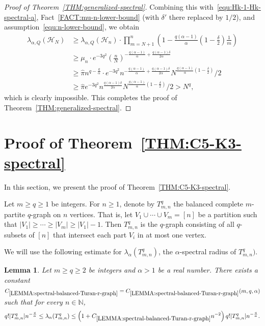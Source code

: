 \documentclass[11pt,a4paper]{article}
\newtheorem{lemma}[definition]{Lemma}
\begin{document}
\begin{proof}[Proof of Theorem~\ref{THM:generalized-spectral}]
    Combining this with~\eqref{equ:Hk-1-Hk-spectral-a}, Fact~\ref{FACT:mu-n-lower-bound} (with $\delta'$ there replaced by $1/2$), and assumption~\eqref{equ:n-lower-bound}, we obtain 
    \begin{align*}
        \lambda_{\alpha, Q}(\mathcal{H}_{N})
        & \ge \lambda_{\alpha, Q}(\mathcal{H}_{n}) \cdot \prod_{m=N+1}^{n} \left(1-\frac{q(\alpha-1)}{\alpha}\left(1-\frac{\delta}{2}\right) \frac{1}{m}\right) \\
        & \ge \mu_{n} \cdot e^{-3q^2} \left(\frac{n}{N}\right)^{-\frac{q(\alpha-1)}{\alpha} + \frac{q(\alpha-1) \delta}{2 \alpha}} \\
        & \ge \hat{\pi} n^{q-\frac{q}{\alpha}} \cdot e^{-3q^2} n^{-\frac{q(\alpha-1)}{\alpha} + \frac{q(\alpha-1) \delta}{2 \alpha}} N^{\frac{q(\alpha-1)}{\alpha}\left(1-\frac{\delta}{2}\right)}/2 \\
        & \ge \hat{\pi} e^{-3q^2} n^{\frac{q(\alpha-1)\delta}{2\alpha} } N^{\frac{q(\alpha-1)}{\alpha}\left(1-\frac{\delta}{2}\right)}/2
        > N^{q}, 
    \end{align*}
    which is clearly impossible. 
    This completes the proof of Theorem~\ref{THM:generalized-spectral}. 
\end{proof}

\section{Proof of Theorem~\ref{THM:C5-K3-spectral}}\label{SEC:Proof-C5-K3}
%
In this section, we present the proof of Theorem~\ref{THM:C5-K3-spectral}.

Let $m \ge q \ge 1$ be integers. 
For $n \ge 1$, denote by $T_{m,n}^{q}$ the balanced complete $m$-partite $q$-graph on $n$ vertices. 
That is, let $V_1 \cup \cdots \cup V_{m} = [n]$ be a partition such that $|V_1| \ge \cdots \ge |V_{m}| \ge |V_{1}|-1$. Then $T_{m,n}^{q}$ is the $q$-graph consisting of all $q$-subsets of $[n]$ that intersect each part $V_i$ in at most one vertex. 

We will use the following estimate for $\lambda_{\alpha}(T_{m,n}^{q})$, the $\alpha$-spectral radius of $T_{m,n}^{q})$. 
%
\begin{lemma}\label{LEMMA:spectral-balanced-Turan-r-graph}
    Let $m \ge q \ge 2$ be integers and $\alpha > 1$ be a real number.
    There exists a constant $C_{\ref{LEMMA:spectral-balanced-Turan-r-graph}} = C_{\ref{LEMMA:spectral-balanced-Turan-r-graph}}(m,q,\alpha)$ such that for every $n \in \mathbb{N}$, 
    \begin{align*}
        {q! |T_{m,n}^{q}|}{n^{-\frac{q}{\alpha}}}
        \le \lambda_{\alpha}(T_{m,n}^{q}) 
        \le \left( 1+ {C_{\ref{LEMMA:spectral-balanced-Turan-r-graph}}}{n^{-2}} \right) {q! |T_{m,n}^{q}|}{n^{-\frac{q}{\alpha}}}. 
    \end{align*}
\end{lemma}
\end{document}
